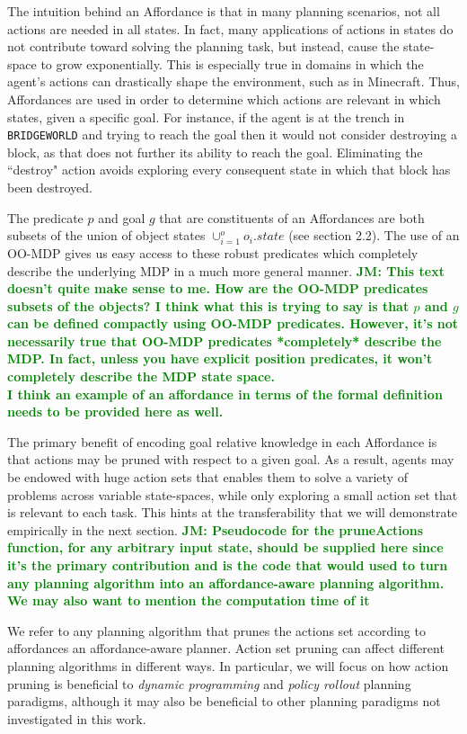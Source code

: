 \documentclass[]{article}
\newcommand{\jmnote}[1]{\textcolor{Green}{\textbf{JM: #1}}}
\begin{document}
The intuition behind an Affordance is that in many planning 
scenarios, not all actions are needed in all states. In fact, many applications 
of actions in states do not contribute toward solving the planning task, but 
instead, cause the state-space to grow exponentially. This is especially true 
in domains in which the agent's actions can drastically shape the environment, 
such as in Minecraft. Thus, Affordances are used in order to determine which 
actions are relevant in which states, given a specific goal. For instance, if the 
agent is at the trench in \texttt{BRIDGEWORLD} and trying to reach the goal then it
would not consider destroying a block, as that does not further its ability
to reach the goal. Eliminating the ``destroy" action avoids 
exploring every consequent state in which that block has been destroyed.

The predicate $p$ and goal $g$ that are constituents of an Affordances are both subsets of the union
of object states $\cup_{i = 1}^o o_i.state$ (see section 2.2).  The use of an OO-MDP gives us easy access to these
robust predicates which completely describe the underlying MDP in a much more general manner.
\jmnote{This text doesn't quite make sense to me. How are the OO-MDP predicates subsets of the
objects? I think what this is trying to say is that $p$ and $g$ can be defined compactly
using OO-MDP predicates. However, it's not necessarily true that OO-MDP predicates *completely* describe the MDP. In fact, unless you have explicit position predicates, it won't completely describe the MDP state space.
\\ I think an example of an affordance in terms of the formal definition needs
to be provided here as well.}


The primary benefit of encoding goal relative knowledge in each Affordance
is that actions may be pruned with respect to a given goal. As a result,
agents may be endowed with huge action sets that enables them to solve a variety of
problems across variable state-spaces, while only exploring a small action set that is
relevant to each task. This
hints at the transferability that we will demonstrate empirically in the next section.
\jmnote{Pseudocode for the pruneActions function, for any arbitrary input state, should be supplied here
since it's the primary contribution and is the code that would used to turn any planning algorithm into an affordance-aware planning algorithm. We may also want to mention the computation time of it}

We refer to any planning algorithm that prunes the actions set according to affordances
an affordance-aware planner. Action set pruning can affect different planning
algorithms in different ways. In particular, we will focus on how action pruning is beneficial to {\em dynamic programming} and {\em policy rollout} planning paradigms, although it may also be beneficial to other planning paradigms not investigated in this work.
\end{document}
